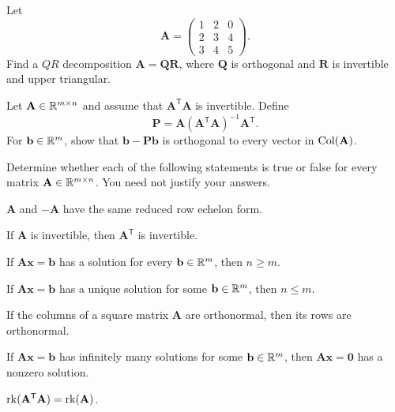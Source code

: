 \begin{problem}
Let
\[
\mathbf A=
\begin{pmatrix}
1&2&0\\
2&3&4\\
3&4&5
\end{pmatrix}.
\]
Find a $QR$ decomposition $\mathbf A=\mathbf Q\mathbf R$, where $\mathbf Q$ is orthogonal and $\mathbf R$ is invertible and upper triangular.
\end{problem}

\begin{problem}
Let $\mathbf A\in\mathbb{R}^{m\times n}$ and assume that $\mathbf A^{\mathsf T}\mathbf A$ is invertible. Define
\[
\mathbf P=\mathbf A(\mathbf A^{\mathsf T}\mathbf A)^{-1}\mathbf A^{\mathsf T}.
\]
For $\mathbf b\in\mathbb{R}^m$, show that $\mathbf b-\mathbf P\mathbf b$ is orthogonal to every vector in $\operatorname{Col}(\mathbf A)$.
\end{problem}

\begin{problem}
Determine whether each of the following statements is true or false for every matrix $\mathbf A\in\mathbb{R}^{m\times n}$. You need not justify your answers.
\begin{problemchoices}
\item $\mathbf A$ and $-\mathbf A$ have the same reduced row echelon form.
\item If $\mathbf A$ is invertible, then $\mathbf A^{\mathsf T}$ is invertible.
\item If $\mathbf A\mathbf x=\mathbf b$ has a solution for every $\mathbf b\in\mathbb{R}^m$, then $n\ge m$.
\item If $\mathbf A\mathbf x=\mathbf b$ has a unique solution for some $\mathbf b\in\mathbb{R}^m$, then $n\le m$.
\item If the columns of a square matrix $\mathbf A$ are orthonormal, then its rows are orthonormal.
\item If $\mathbf A\mathbf x=\mathbf b$ has infinitely many solutions for some $\mathbf b\in\mathbb{R}^m$, then $\mathbf A\mathbf x=\mathbf 0$ has a nonzero solution.
\item $\operatorname{rk}(\mathbf A^{\mathsf T}\mathbf A)=\operatorname{rk}(\mathbf A)$.
\end{problemchoices}
\end{problem}

